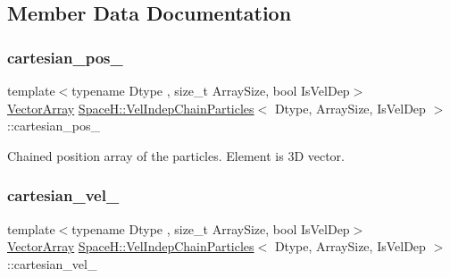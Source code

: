 \subsection{Member Data Documentation}
\mbox{\label{class_space_h_1_1_vel_indep_chain_particles_ae1479bfdab0d0676ee500f878698a75a}} 
\subsubsection{\texorpdfstring{cartesian\+\_\+pos\+\_\+}{cartesian\_pos\_}}
{\footnotesize\ttfamily template$<$typename Dtype , size\+\_\+t Array\+Size, bool Is\+Vel\+Dep$>$ \\
\mbox{\hyperlink{class_space_h_1_1_vel_indep_particles_aa9983058940249df8b00fa800e8cbad2}{Vector\+Array}} \mbox{\hyperlink{class_space_h_1_1_vel_indep_chain_particles}{Space\+H\+::\+Vel\+Indep\+Chain\+Particles}}$<$ Dtype, Array\+Size, Is\+Vel\+Dep $>$\+::cartesian\+\_\+pos\+\_\+\hspace{0.3cm}{\ttfamily [protected]}}



Chained position array of the particles. Element is 3D vector. 

\mbox{\label{class_space_h_1_1_vel_indep_chain_particles_a8634735aa331abbdd5befc3d208b11eb}} 
\subsubsection{\texorpdfstring{cartesian\+\_\+vel\+\_\+}{cartesian\_vel\_}}
{\footnotesize\ttfamily template$<$typename Dtype , size\+\_\+t Array\+Size, bool Is\+Vel\+Dep$>$ \\
\mbox{\hyperlink{class_space_h_1_1_vel_indep_particles_aa9983058940249df8b00fa800e8cbad2}{Vector\+Array}} \mbox{\hyperlink{class_space_h_1_1_vel_indep_chain_particles}{Space\+H\+::\+Vel\+Indep\+Chain\+Particles}}$<$ Dtype, Array\+Size, Is\+Vel\+Dep $>$\+::cartesian\+\_\+vel\+\_\+\hspace{0.3cm}{\ttfamily [protected]}}



